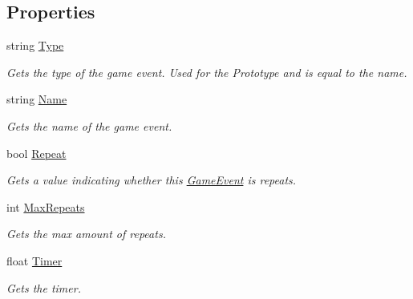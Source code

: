 \subsection*{Properties}
\begin{DoxyCompactItemize}
\item 
string \hyperlink{class_game_event_ad8921f17ac09eb80cfe3428020d4a160}{Type}
\begin{DoxyCompactList}\small\item\em Gets the type of the game event. Used for the Prototype and is equal to the name. \end{DoxyCompactList}\item 
string \hyperlink{class_game_event_a9dcf75aa8906aeabdbc1039fe7968503}{Name}
\begin{DoxyCompactList}\small\item\em Gets the name of the game event. \end{DoxyCompactList}\item 
bool \hyperlink{class_game_event_aaa381ffa74bbae7bb3cf78994d1bb3ef}{Repeat}
\begin{DoxyCompactList}\small\item\em Gets a value indicating whether this \hyperlink{class_game_event}{Game\+Event} is repeats. \end{DoxyCompactList}\item 
int \hyperlink{class_game_event_a091a536003bfe1c09a4b84d724cf90d6}{Max\+Repeats}
\begin{DoxyCompactList}\small\item\em Gets the max amount of repeats. \end{DoxyCompactList}\item 
float \hyperlink{class_game_event_a7e22dae8daf4f8e5a89e7ef0c13e2aaf}{Timer}
\begin{DoxyCompactList}\small\item\em Gets the timer. \end{DoxyCompactList}\end{DoxyCompactItemize}


